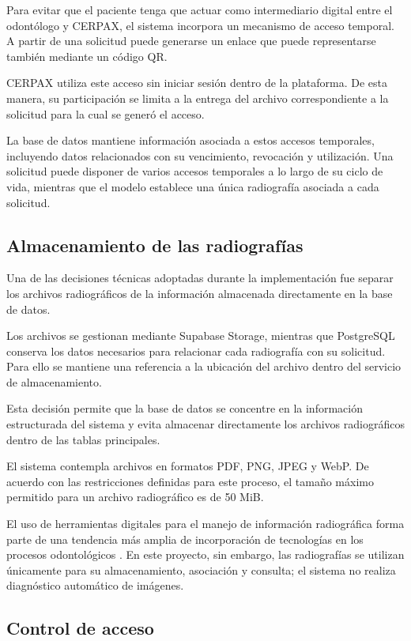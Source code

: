 Para evitar que el paciente tenga que actuar como intermediario digital entre
el odontólogo y CERPAX, el sistema incorpora un mecanismo de acceso temporal.
A partir de una solicitud puede generarse un enlace que puede representarse
también mediante un código QR.

CERPAX utiliza este acceso sin iniciar sesión dentro de la plataforma. De esta
manera, su participación se limita a la entrega del archivo correspondiente a
la solicitud para la cual se generó el acceso.

La base de datos mantiene información asociada a estos accesos temporales,
incluyendo datos relacionados con su vencimiento, revocación y utilización.
Una solicitud puede disponer de varios accesos temporales a lo largo de su
ciclo de vida, mientras que el modelo establece una única radiografía asociada
a cada solicitud.

\subsection{Almacenamiento de las radiografías}

Una de las decisiones técnicas adoptadas durante la implementación fue separar
los archivos radiográficos de la información almacenada directamente en la
base de datos.

Los archivos se gestionan mediante Supabase Storage, mientras que PostgreSQL
conserva los datos necesarios para relacionar cada radiografía con su
solicitud. Para ello se mantiene una referencia a la ubicación del archivo
dentro del servicio de almacenamiento.

Esta decisión permite que la base de datos se concentre en la información
estructurada del sistema y evita almacenar directamente los archivos
radiográficos dentro de las tablas principales.

El sistema contempla archivos en formatos PDF, PNG, JPEG y WebP. De acuerdo
con las restricciones definidas para este proceso, el tamaño máximo permitido
para un archivo radiográfico es de 50 MiB.

El uso de herramientas digitales para el manejo de información radiográfica
forma parte de una tendencia más amplia de incorporación de tecnologías en
los procesos odontológicos . En este
proyecto, sin embargo, las radiografías se utilizan únicamente para su
almacenamiento, asociación y consulta; el sistema no realiza diagnóstico
automático de imágenes.

\subsection{Control de acceso}

